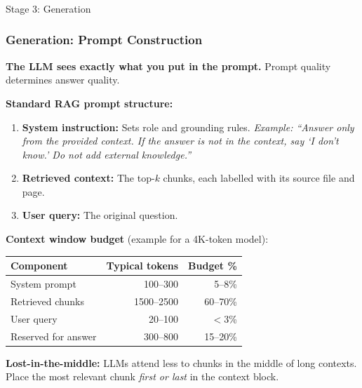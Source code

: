 \begin{frame}[fragile]\frametitle{}
\begin{center}
{\Large Stage 3: Generation}
\end{center}
\end{frame}

\begin{frame}[fragile]\frametitle{Generation: Prompt Construction}

\textbf{The LLM sees exactly what you put in the prompt.} Prompt quality determines answer quality.

\vspace{0.3em}
\textbf{Standard RAG prompt structure:}
\begin{enumerate}
  \item \textbf{System instruction:} Sets role and grounding rules.
  \newline \textit{Example: ``Answer only from the provided context. If the answer is not in the context, say `I don't know.' Do not add external knowledge.''}
  \item \textbf{Retrieved context:} The top-$k$ chunks, each labelled with its source file and page.
  \item \textbf{User query:} The original question.
\end{enumerate}

\vspace{0.3em}
\textbf{Context window budget} (example for a 4K-token model):
\begin{center}
\small
\begin{tabular}{lrr}
\hline
\textbf{Component} & \textbf{Typical tokens} & \textbf{Budget \%} \\
\hline
System prompt     & 100--300   & 5--8\% \\
Retrieved chunks  & 1500--2500 & 60--70\% \\
User query        & 20--100    & $<$3\% \\
Reserved for answer & 300--800 & 15--20\% \\
\hline
\end{tabular}
\end{center}

\vspace{0.2em}
\textbf{Lost-in-the-middle:} LLMs attend less to chunks in the middle of long contexts. Place the most relevant chunk \textit{first or last} in the context block.

\end{frame}

